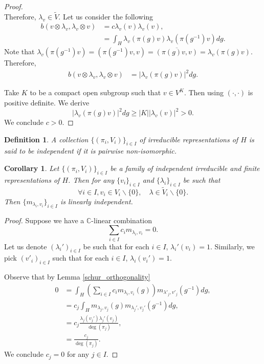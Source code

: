 \documentclass[8pt]{article}
\newtheorem{definition}{Definition}[section]
\newtheorem{corollary}{Corollary} [section]
\newcommand{\C}[0]{\mathbb{C}}
\newcommand{\zero}[0]{\{0\}}
\newcommand{\nonzero}[0]{\backslash\zero}
\begin{document}
\begin{proof}
\begin{equation*}
  \end{equation*}
  Therefore, $\lambda_v\in\widetilde{V}$. Let us consider the following 
  \begin{align*}
    b(v\otimes\lambda_v,\lambda_v\otimes v) & = c\lambda_v(v)\lambda_v(v),\\
    & = \int_H\lambda_v(\pi(g)v)\lambda_v(\pi(g^{-1})v)dg.
  \end{align*}
  Note that $\lambda_v(\pi(g^{-1})v) = (\pi(g^{-1})v,v) = \overline{(\pi(g)v,v)} = \lambda_v(\pi(g)v)$. Therefore, 
  \begin{align*}
    b(v\otimes\lambda_v,\lambda_v\otimes v) & = \vert \lambda_v(\pi(g)v)\vert^2dg.
  \end{align*}
  \par Take $K$ to be a compact open subgroup such that $v\in V^K$. Then using $(\cdot,\cdot)$ is positive definite. We derive 
  \begin{equation*}
    \vert \lambda_v(\pi(g)v)\vert^2dg\geq \vert K\vert\vert\lambda_v(v)\vert^2>0.
  \end{equation*}
  We conclude $c>0$.
\end{proof}

\begin{definition}
  A collection $\{(\pi_i,V_i)\}_{i\in I}$ of irreducible representations of $H$ is said to be independent if it is pairwise non-isomorphic. 
\end{definition}

\begin{corollary}
  Let $\{(\pi_i,V_i)\}_{i\in I}$ be a family of independent irreducible and finite representations of $H$. Then for any $\{v_i\}_{i\in I}$ and $\{\lambda_i\}_{i\in I}$ be such that 
  \begin{equation*}
    \forall i\in I, v_i\in V_i\nonzero,\quad \lambda\in\widetilde{V}_i\nonzero.
  \end{equation*}
  Then $\{m_{\lambda_i,v_i}\}_{i\in I}$ is linearly independent. 
\end{corollary}

\begin{proof}
Suppose we have a $\C$-linear combination
\begin{equation*}
  \sum_{i\in I} c_i m_{\lambda_i,v_i} = 0.
\end{equation*}
Let us denote $(\lambda_i')_{i\in I}$ be such that for each $i\in I$, $\lambda_i'(v_i) = 1$. Similarly, we pick $(v'_i)_{i\in I}$ such that for each $i\in I$, $\lambda_i(v_i') = 1$. 
\par Observe that by Lemma \ref{schur_orthogonality}
\begin{align*}
0& = \int_H\left(\sum_{i\in I}c_im_{\lambda_i,v_i}(g)\right)m_{\lambda'_j,v'_j}(g^{-1})dg,\\
& = c_j\int_Hm_{\lambda_j,v_j}(g)m_{\lambda_j',v_j'}(g^{-1})dg,\\
& = c_j{\frac {\lambda_j(v_j')\lambda_j'(v_j)} {\deg(\pi_j)}},\\
& = {\frac {c_j} {\deg(\pi_j)}}.
\end{align*}
We conclude $c_j=0$ for any $j\in I$. 
\end{proof}
\end{document}

